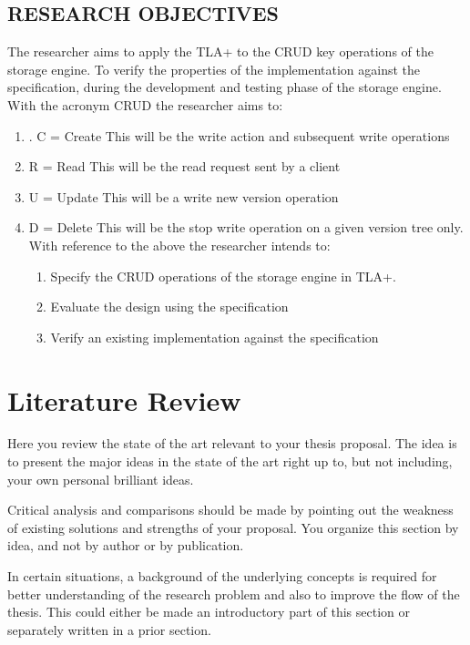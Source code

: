 \documentclass[11pt,a4paper,oneside]{book} %
\numberwithin{equation}{section}
\begin{document}
\section{RESEARCH OBJECTIVES}
The researcher aims to apply the TLA+ to the CRUD key operations of the storage engine. To
verify the properties of the implementation against the specification, during the development
and testing phase of the storage engine.
With the acronym CRUD the researcher aims to:
\begin{enumerate}

\item. C = Create
This will be the write action and subsequent write operations
\item R = Read
This will be the read request sent by a client
\item U = Update
This will be a write new version operation
\item D = Delete
This will be the stop write operation on a given version tree only.
With reference to the above the researcher intends to:
\begin{enumerate}
\item Specify the CRUD operations of the storage engine in TLA+.
\item Evaluate the design using the specification
\item Verify an existing implementation against the specification
\end{enumerate}
\end{enumerate}

\chapter{Literature Review}\label{c-review}
Here you review the state of the art relevant to your thesis proposal. The idea is to present the major ideas in the state of the art right up to, but not including, your own personal brilliant ideas.

Critical analysis and comparisons should be made by pointing out the weakness of existing solutions and strengths of your proposal. You organize this section by idea, and not by author or by publication.

In certain situations, a background of the underlying concepts is required for better understanding of the research problem and also to improve the flow of the thesis. This could either be made an introductory part of this section or separately written in a prior section.
\end{document}
